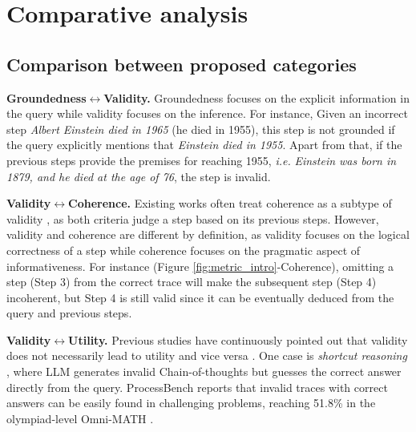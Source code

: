 \section{Comparative analysis}
\label{sec:comparison}

\subsection{Comparison between proposed categories}
\label{sec:comparison-ours}

\textbf{Groundedness$\leftrightarrow$Validity.} Groundedness focuses on the explicit information in the query while validity focuses on the inference. For instance, Given an incorrect step \textit{Albert Einstein died in 1965} (he died in 1955), this step is not grounded if the query explicitly mentions that \textit{Einstein died in 1955}. Apart from that, if the previous steps provide the premises for reaching 1955, \textit{i.e.} \textit{Einstein was born in 1879, and he died at the age of 76}, the step is invalid.

\textbf{Validity$\leftrightarrow$Coherence.} Existing works often treat coherence as a subtype of validity \citep{DBLP:conf/iclr/GolovnevaCPCZFC23, zhu2024deductivebeamsearchdecoding, kim2024biggenbenchprincipledbenchmark, jacovi-etal-2024-chain}, as both criteria judge a step based on its previous steps. However, validity and coherence are different by definition, as validity focuses on the logical correctness of a step while coherence focuses on the pragmatic aspect of informativeness. For instance (Figure \ref{fig:metric_intro}-Coherence), omitting a step (Step 3) from the correct trace will make the subsequent step (Step 4) incoherent, but Step 4 is still valid since it can be eventually deduced from the query and previous steps.

\textbf{Validity$\leftrightarrow$Utility.} Previous studies have continuously pointed out that validity does not necessarily lead to utility and vice versa \citep{lyu-etal-2023-faithful, nguyen-etal-2024-direct}. One case is \textit{shortcut reasoning} \citep{schnitzler2024morehopqa, lee2025symbasymbolicbackwardchaining}, where LLM generates invalid Chain-of-thoughts but guesses the correct answer directly from the query. ProcessBench \citep{zheng2024processbenchidentifyingprocesserrors} reports that invalid traces with correct answers can be easily found in challenging problems, reaching 51.8\% in the olympiad-level Omni-MATH \citep{gao2024omnimathuniversalolympiadlevel}.

